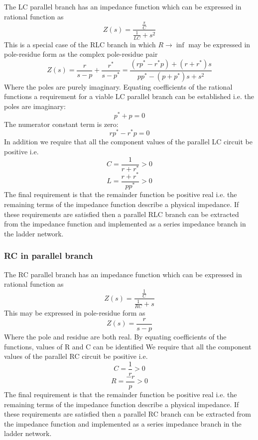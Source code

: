 The LC parallel branch has an impedance function which can be expressed in rational function as
\begin{equation} 
Z\left(s\right)=\frac{\frac{s}{C}}{\frac{1}{L C} + s^2}
\end{equation}
This is a special case of the RLC branch in which $R\rightarrow \inf$ may be expressed in pole-residue form as the complex pole-residue pair
\begin{equation} 
Z\left(s\right)= \frac{r}{s-p}+\frac{r^*}{s-p^*}=\frac{\left(rp^*-r^*p\right)+\left( r+r^*\right)s}{pp^*-\left( p+p^*\right)s+s^2}
\end{equation}
Where the poles are purely imaginary. Equating coefficients of the rational functions a requirement for a viable LC parallel branch can be established i.e. the poles are imaginary:
\begin{equation} 
p^*+p=0
\end{equation}
The numerator constant term is zero:
\begin{equation} 
rp^*-r^*p=0
\end{equation}
In addition we require that all the component values of the parallel LC circuit be positive i.e.
\begin{equation} 
C=\frac{1}{r+r^*}>0
\end{equation}
\begin{equation} 
L=\frac{r+r^*}{pp^*}>0
\end{equation}
The final requirement is that the remainder function be positive real i.e. the remaining terms of the impedance function describe a physical impedance. If these requirements are satisfied then a parallel RLC branch can be extracted from the impedance function and implemented as a series impedance branch in the ladder network. 

\subsubsection{RC in parallel branch}

The RC parallel branch has an impedance function which can be expressed in rational function as
\begin{equation} 
Z\left(s\right)=\frac{\frac{1}{C}}{\frac{1}{R C} + s}
\end{equation}
This may be expressed in pole-residue form as
\begin{equation} 
Z\left(s\right)= \frac{r}{s-p}
\end{equation}
Where the pole and residue are both real. By equating coefficients of the functions, values of R and C can be identified
We require that all the component values of the parallel RC circuit be positive i.e.
\begin{equation} 
C=\frac{1}{r}>0
\end{equation}
\begin{equation} 
R=\frac{-r}{p}>0
\end{equation}
The final requirement is that the remainder function be positive real i.e. the remaining terms of the impedance function describe a physical impedance. If these requirements are satisfied then a parallel RC branch can be extracted from the impedance function and implemented as a series impedance branch in the ladder network. 


